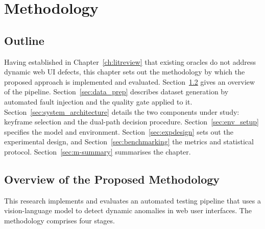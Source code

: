 %
%

\chapter{Methodology}
\label{chap:methodology}


\section{Outline}
\label{sec:m-outline}

Having established in Chapter~\ref{ch:litreview} that existing oracles do
not address dynamic web UI defects, this chapter sets out the methodology
by which the proposed approach is implemented and evaluated.
Section~\ref{sec:overview} gives an overview of the pipeline.
Section~\ref{sec:data_prep} describes dataset generation by automated
fault injection and the quality gate applied to it.
Section~\ref{sec:system_architecture} details the two components under
study: keyframe selection and the dual-path decision procedure.
Section~\ref{sec:env_setup} specifies the model and environment.
Section~\ref{sec:expdesign} sets out the experimental design, and
Section~\ref{sec:benchmarking} the metrics and statistical protocol.
Section~\ref{sec:m-summary} summarises the chapter.


\section{Overview of the Proposed Methodology}
\label{sec:overview}

This research implements and evaluates an automated testing pipeline that
uses a vision-language model to detect dynamic anomalies in web user
interfaces. The methodology comprises four stages.

